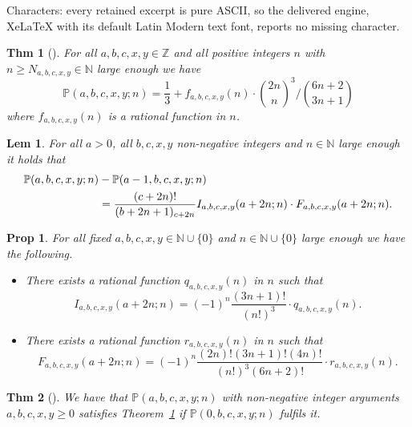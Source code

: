 \documentclass[10pt,a4paper]{amsart}
\newtheorem{lem}{Lem}
\newtheorem{prop}{Prop}
\newtheorem{thm}{Thm}
\newcommand*{\N}{\mathbb{N}}
\newcommand*{\Z}{\mathbb{Z}}
\begin{document}
Characters: every retained excerpt is pure ASCII, so the delivered engine, XeLaTeX with its default Latin Modern text font, reports no missing character.
\begin{thm}[]\label{1/3}
    For all $a,b,c,x,y\in\Z$ and all positive integers $n$ with $n\geq N_{a,b,c,x,y}\in\N$ large enough we have
    \[\mathbb{P}(a,b,c,x,y;n)=\frac{1}{3}+f_{a,b,c,x,y}(n)\cdot\binom{2n}{n}^3\bigg/\binom{6n+2}{3n+1}\]
    where $f_{a,b,c,x,y}(n)$ is a rational function in $n$.
\end{thm}

\begin{lem}\label{redA}
    For all $a>0$, all $b,c,x,y$ non-negative integers and $n\in\N$ large enough it holds that
    \begin{align}
        \mathbb{P}(a,b,c,x,y;n)&-\mathbb{P}(a-1,b,c,x,y;n)\notag\\
        &=\frac{(c+2n)!}{(b+2n+1)_{c+2n}}I_{a,b,c,x,y}(a+2n;n)\cdot F_{a,b,c,x,y}(a+2n;n).\notag
    \end{align}
\end{lem}

\begin{prop}\label{IFshape}
    For all fixed $a,b,c,x,y\in \N\cup\{0\}$ and $n\in \N\cup\{0\}$ large enough we have the following.
    \begin{itemize}
        \item[(i)] There exists a rational function $q_{a,b,c,x,y}(n)$ in $n$ such that
        \[I_{a,b,c,x,y}(a+2n;n)=(-1)^n\frac{(3n+1)!}{(n!)^3}\cdot q_{a,b,c,x,y}(n).\]
        \item[(ii)] There exists a rational function $r_{a,b,c,x,y}(n)$ in $n$ such that
        \[F_{a,b,c,x,y}(a+2n;n)=(-1)^n\frac{(2n)!(3n+1)!(4n)!}{(n!)^3 (6n+2)!}\cdot r_{a,b,c,x,y}(n).\]
    \end{itemize}
\end{prop}

\begin{thm}[]\label{pararedA}
    We have that $\mathbb{P}(a,b,c,x,y;n)$ with non-negative integer arguments $a,b,c,x,y\geq 0$ satisfies Theorem~\ref{1/3} if $\mathbb{P}(0,b,c,x,y;n)$ fulfils it. 
\end{thm}
\end{document}
